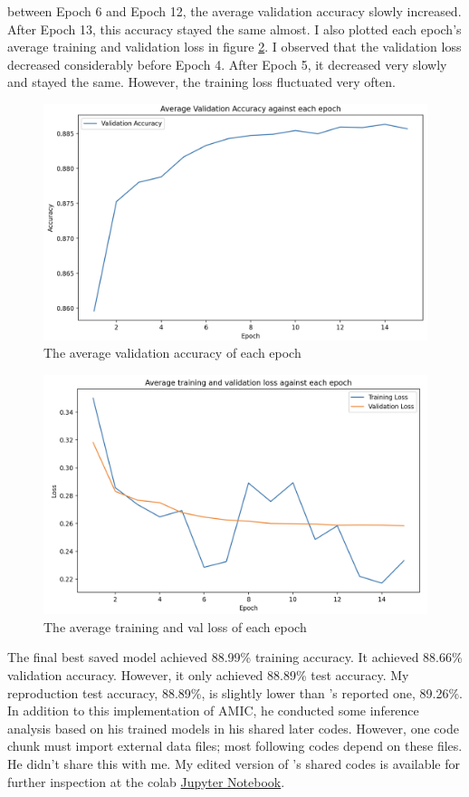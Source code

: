 \documentclass[aoas]{imsart}
\numberwithin{equation}{section}
\theoremstyle{plain}
\theoremstyle{remark}
\begin{document}
between Epoch 6 and Epoch 12, the average validation accuracy slowly increased. After Epoch 13, this accuracy stayed the same almost. I also plotted each epoch's average training and validation loss in figure \ref{Fig14: loss}. I observed that the validation loss decreased considerably before Epoch 4. After Epoch 5, it decreased very slowly and stayed the same. However, the training loss fluctuated very often.  
\begin{figure}[ht]
\includegraphics[scale=0.3]{img/val.png}
\caption{The average validation accuracy of each epoch}
\label{Fig13: val}
\end{figure}
\begin{figure}[ht]
\includegraphics[scale=0.3]{img/loss.png}
\caption{The average training and val loss of each epoch}
\label{Fig14: loss}
\end{figure}
The final best saved model achieved 88.99\% training accuracy. It achieved 88.66\% validation accuracy. However, it only achieved 88.89\% test accuracy. My reproduction test accuracy, 88.89\%, is slightly lower than \cite{chenyu}'s reported one, 89.26\%. In addition to this implementation of AMIC, he conducted some inference analysis based on his trained models in his shared later codes. However, one code chunk must import external data files; most following codes depend on these files. He didn't share this with me. My edited version of \cite{chenyu}'s shared codes is available for further inspection at the colab \href{https://drive.google.com/file/d/181pkl3XwtB9SV06hoC_XT0XMyrzAlJoJ/view?usp=sharing}{Jupyter Notebook}.
\end{document}

